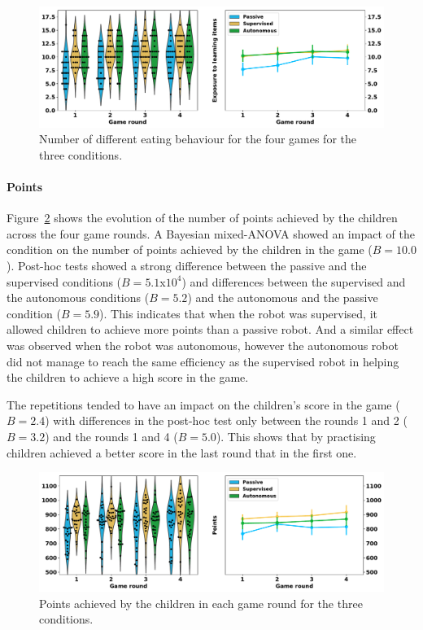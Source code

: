 \begin{figure}[ht]
	\includegraphics[width=1\linewidth]{d_eat.pdf}
	\centering
	\caption{Number of different eating behaviour for the four games for the three conditions.}
	\label{fig:tutoring_d_eat}
\end{figure}

\paragraph{Points}

Figure~\ref{fig:tutoring_points} shows the evolution of the number of points achieved by the children across the four game rounds. A Bayesian mixed-ANOVA showed an impact of the condition on the number of points achieved by the children in the game ($B=10.0$). Post-hoc tests showed a strong difference between the passive and the supervised conditions ($B=5.1$x$10^4$) and differences between the supervised and the autonomous conditions ($B=5.2$) and the autonomous and the passive condition ($B=5.9$). This indicates that when the robot was supervised, it allowed children to achieve more points than a  passive robot. And a similar effect was observed when the robot was autonomous, however the autonomous robot did not manage to reach the same efficiency as the supervised robot in helping the children to achieve a high score in the game.

The repetitions tended to have an impact on the children's score in the game ($B=2.4$) with differences in the post-hoc test only between the rounds 1 and 2 ($B=3.2$) and the rounds 1 and 4 ($B=5.0$). This shows that by practising children achieved a better score in the last round that in the first one.

\begin{figure}[ht]
	\includegraphics[width=1\linewidth]{points.pdf}
	\centering
	\caption{Points achieved by the children in each game round for the three conditions.}
	\label{fig:tutoring_points}
\end{figure}

